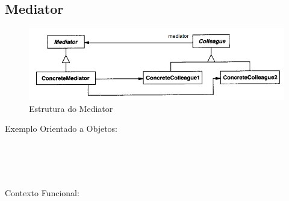 \subsection{Mediator}

\begin{figure}[htb]
	\caption{\label{fig_grafico}Estrutura do Mediator}
	\begin{center}
	    \includegraphics[scale=0.5]{5_padroes-contexto-funcional/5.3_comportamentais/5.3.05_mediator/diagram.png}
	\end{center}
\end{figure}

Exemplo Orientado a Objetos:

\begin{lstlisting}[caption={Mediator Orientação a Objetos},label=oomediator]


    
\end{lstlisting}

Contexto Funcional:


\begin{lstlisting}[caption={Mediator Funcional},label=fpmediator]
    

    
\end{lstlisting}